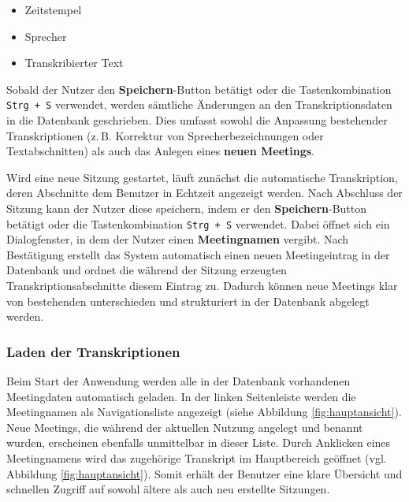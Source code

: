 \begin{itemize}
    \item Zeitstempel
    \item Sprecher
    \item Transkribierter Text
\end{itemize}

Sobald der Nutzer den \textbf{Speichern}-Button betätigt oder die Tastenkombination \texttt{Strg + S} verwendet, werden sämtliche Änderungen an den Transkriptionsdaten in die Datenbank geschrieben.  Dies umfasst sowohl die Anpassung bestehender Transkriptionen (z.\,B. Korrektur von Sprecherbezeichnungen oder Textabschnitten) als auch das Anlegen eines \textbf{neuen Meetings}.

Wird eine neue Sitzung gestartet, läuft zunächst die automatische Transkription, deren Abschnitte dem Benutzer in Echtzeit angezeigt werden. Nach Abschluss der Sitzung kann der Nutzer diese speichern, indem er den \textbf{Speichern}-Button betätigt oder die Tastenkombination \texttt{Strg + S} verwendet.  Dabei öffnet sich ein Dialogfenster, in dem der Nutzer einen \textbf{Meetingnamen} vergibt. Nach Bestätigung erstellt das System automatisch einen neuen Meetingeintrag in der Datenbank und ordnet die während der Sitzung erzeugten Transkriptionsabschnitte diesem Eintrag zu.  Dadurch können neue Meetings klar von bestehenden unterschieden und strukturiert in der Datenbank abgelegt werden.

\subsubsection{Laden der Transkriptionen}
Beim Start der Anwendung werden alle in der Datenbank vorhandenen Meetingdaten automatisch geladen.  In der linken Seitenleiste werden die Meetingnamen als Navigationsliste angezeigt (siehe Abbildung \ref{fig:hauptansicht}).  Neue Meetings, die während der aktuellen Nutzung angelegt und benannt wurden, erscheinen ebenfalls unmittelbar in dieser Liste.  Durch Anklicken eines Meetingnamens wird das zugehörige Transkript im Hauptbereich geöffnet (vgl. Abbildung \ref{fig:hauptansicht}).  Somit erhält der Benutzer eine klare Übersicht und schnellen Zugriff auf sowohl ältere als auch neu erstellte Sitzungen.

